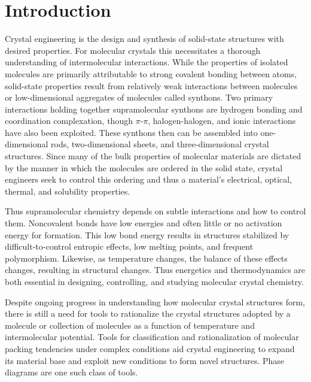 \documentclass[preprint]{iucr}              %
\begin{document}
\pagebreak

\section{Introduction}

Crystal engineering is the design and synthesis of solid-state structures with
desired properties.  For molecular crystals this necessitates a thorough
understanding of intermolecular interactions.  While the properties of
isolated molecules are primarily attributable to strong covalent bonding
between atoms, solid-state properties result from relatively weak interactions
between molecules or low-dimensional aggregates of molecules called synthons. 
Two primary interactions holding together supramolecular synthons are hydrogen
bonding and coordination complexation, though $\pi$-$\pi$, halogen-halogen, and
ionic interactions have also been exploited\cite{Thalladi96}. These synthons
then can be assembled into one-dimensional rods, two-dimensional sheets, and
three-dimensional crystal structures. Since many of the bulk properties of
molecular materials are dictated by the manner in which the molecules are
ordered in the solid state, crystal engineers seek to control this ordering and
thus a material's electrical, optical, thermal, and solubility
properties\cite{Desiraju89,Braga99,Bassoul00,Lommerse00,Holman01b,Moulton01}.

Thus supramolecular chemistry depends on subtle interactions and how to control
them.  Noncovalent bonds have low energies and often little or no activation
energy for formation. This low bond energy results in structures stabilized by
difficult-to-control entropic effects, low melting points, and frequent
polymorphism. Likewise, as temperature changes, the balance of these effects
changes, resulting in structural changes\cite{Neumann03}.  Thus energetics and
thermodynamics are both essential in designing, controlling, and studying
molecular crystal chemistry. 

Despite ongoing progress in understanding how molecular crystal structures form,
there is still a need for tools to rationalize the crystal structures adopted by
a molecule or collection of molecules as a function of temperature and
intermolecular potential.  Tools for classification and rationalization of
molecular packing tendencies under complex conditions aid crystal engineering to
expand its material base and exploit new conditions to form novel structures. 
Phase diagrams are one such class of tools.
\end{document}
